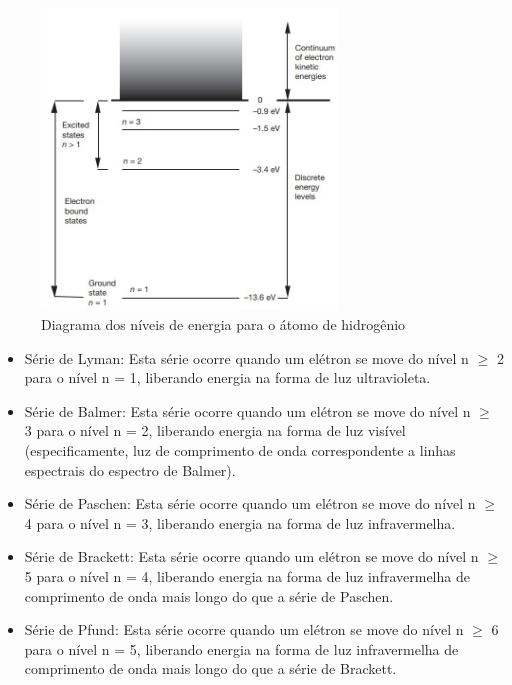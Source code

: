 \documentclass[11pt,a4paper]{article}
\newcounter{exemplo}
\begin{document}
		\begin{figure}[h]
			\centering
			\includegraphics[width=0.7\textwidth]{Imagens/diagramaNiveisDeEnergiaParaOAtomoDeHidrogenio.jpg}
			\caption{Diagrama dos níveis de energia para o átomo de hidrogênio}
			\label{fig:diagramaNiveisDeEnergiaParaOAtomoDeHidrogenio}
		\end{figure}

	\begin{exemplo}
		\begin{itemize}

			\item Série de Lyman: Esta série ocorre quando um elétron se move do nível n $\geqslant $ 2 para o nível n = 1, liberando energia na forma de luz ultravioleta.		
			\item Série de Balmer: Esta série ocorre quando um elétron se move do nível n $\geqslant $ 3 para o nível n = 2, liberando energia na forma de luz visível (especificamente, luz de comprimento de onda correspondente a linhas espectrais do espectro de Balmer).		
			\item Série de Paschen: Esta série ocorre quando um elétron se move do nível n $\geqslant $ 4 para o nível n = 3, liberando energia na forma de luz infravermelha.		
			\item Série de Brackett: Esta série ocorre quando um elétron se move do nível n $\geqslant $ 5 para o nível n = 4, liberando energia na forma de luz infravermelha de comprimento de onda mais longo do que a série de Paschen.		
			\item Série de Pfund: Esta série ocorre quando um elétron se move do nível n $\geqslant $ 6 para o nível n = 5, liberando energia na forma de luz infravermelha de comprimento de onda mais longo do que a série de Brackett.
		\end{itemize}
	\end{exemplo}
\end{document}
